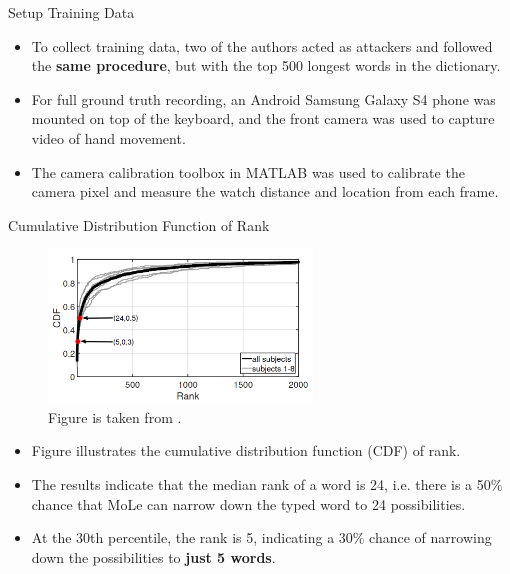 \documentclass[ucs,9pt,usenames,dvipsnames]{beamer}
\begin{document}
\begin{frame}{Setup Training Data}
	\begin{itemize}
		\item To collect training data, two of the authors acted as attackers and followed the \textbf{same procedure}, but with the top 500 longest words in the dictionary.
		\item For full ground truth recording, an Android Samsung Galaxy S4 phone was mounted on top of the keyboard, and the front camera was used to capture video of hand movement. 
		\item The camera calibration toolbox in MATLAB was used to calibrate the camera pixel and measure the watch distance and location from each frame.
	\end{itemize}
\end{frame}


\begin{frame}{Cumulative Distribution Function of Rank}
\begin{figure}
	\centering
	\includegraphics[width=7cm]{imgs/cdfInferTyped.png}
	\caption{Figure is taken from \cite{b1}.}
\end{figure}
	
\begin{itemize}
	\item Figure illustrates the cumulative distribution function (CDF) of rank. %
	 \item The results indicate that the median rank of a word is 24, i.e. there is a 50\% chance that MoLe can narrow down the typed word to 24 possibilities. 
	 \item At the 30th percentile, the rank is 5, indicating a 30\% chance of narrowing down the possibilities to \textbf{just 5 words}. %
\end{itemize}
\end{frame}
\end{document}
